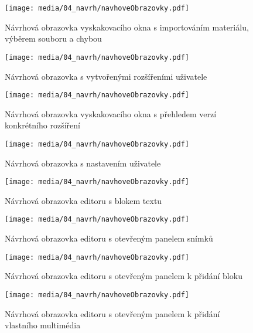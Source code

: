 \begin{figure}[ht!]
    \centering
    \texttt{[image: media/04\_navrh/navhoveObrazovky.pdf]}
    \caption{Návrhová obrazovka vyskakovacího okna s importováním materiálu, výběrem souboru a chybou}
\end{figure}


\begin{figure}[ht!]
    \centering
    \texttt{[image: media/04\_navrh/navhoveObrazovky.pdf]}
    \caption{Návrhová obrazovka s vytvořenými rozšířeními uživatele}
\end{figure}

\begin{figure}[ht!]
    \centering
    \texttt{[image: media/04\_navrh/navhoveObrazovky.pdf]}
    \caption{Návrhová obrazovka vyskakovacího okna s přehledem verzí konkrétního rozšíření}
\end{figure}


\begin{figure}[ht!]
    \centering
    \texttt{[image: media/04\_navrh/navhoveObrazovky.pdf]}
    \caption{Návrhová obrazovka s nastavením uživatele}
\end{figure}

\begin{figure}[ht!]
    \centering
    \texttt{[image: media/04\_navrh/navhoveObrazovky.pdf]}
    \caption{Návrhová obrazovka editoru s blokem textu}
\end{figure}

\begin{figure}[ht!]
    \centering
    \texttt{[image: media/04\_navrh/navhoveObrazovky.pdf]}
    \caption{Návrhová obrazovka editoru s otevřeným panelem snímků}
\end{figure}


\begin{figure}[ht!]
    \centering
    \texttt{[image: media/04\_navrh/navhoveObrazovky.pdf]}
    \caption{Návrhová obrazovka editoru s otevřeným panelem k přidání bloku}
\end{figure}


\begin{figure}[ht!]
    \centering
    \texttt{[image: media/04\_navrh/navhoveObrazovky.pdf]}
    \caption{Návrhová obrazovka editoru s otevřeným panelem k přidání vlastního multimédia}
\end{figure}


